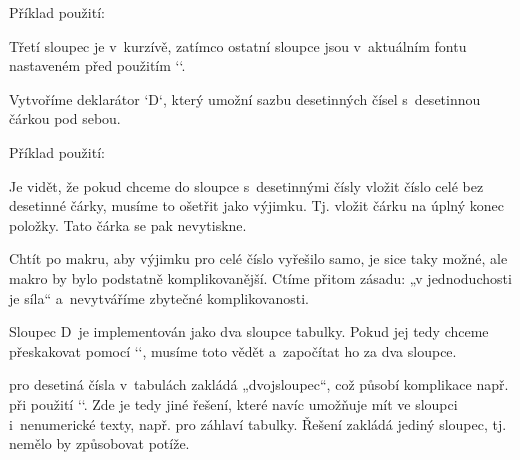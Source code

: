 \begtt
\def\tabdeclareic{\tabiteml\it\hfil##\unsskip\hfil\tabitemr} 
\def\tabdeclareil{\tabiteml\it##\unsskip\hfil\tabitemr} 
\def\tabdeclareir{\tabiteml\it\hfil##\unsskip\tabitemr} 
\endtt


Příklad použití: 

\begtt
{} 
\endtt


Třetí sloupec je v~kurzívě, zatímco ostatní sloupce jsou v~aktuálním fontu nastaveném před použitím `\table`. 


 


Vytvoříme deklarátor `D`, který umožní sazbu desetinných čísel s~desetinnou čárkou pod sebou. 

\begtt
\def\tabdeclareD{\tabiteml\hfil\scandecnumber##&##\hfil\tabitemr} 
\def\scandecnumber#1,{#1\ifdim\lastskip>0pt \unskip\phantom,\else,\fi&} 
\endtt


Příklad použití: 

\begtt
{} 
\endtt


Je vidět, že pokud chceme do sloupce s~desetinnými čísly vložit číslo celé bez desetinné čárky, musíme to ošetřit jako výjimku. Tj. vložit čárku na úplný konec položky. Tato čárka se pak nevytiskne. 



Chtít po makru, aby výjimku pro celé číslo vyřešilo samo, je sice taky možné, ale makro by bylo podstatně komplikovanější. Ctíme přitom zásadu: „v jednoduchosti je síla“ a~nevytváříme zbytečné komplikovanosti. 



Sloupec D~je implementován jako dva sloupce tabulky. Pokud jej tedy chceme přeskakovat pomocí `\multispan`, musíme toto vědět a~započítat ho za dva sloupce. 


 


 pro desetiná čísla v~tabulách zakládá „dvojsloupec“, což působí komplikace např. při použití `\tskip`. Zde je tedy jiné řešení, které navíc umožňuje mít ve sloupci i~nenumerické texty, např. pro záhlaví tabulky. Řešení zakládá jediný sloupec, tj. nemělo by způsobovat potíže. 



